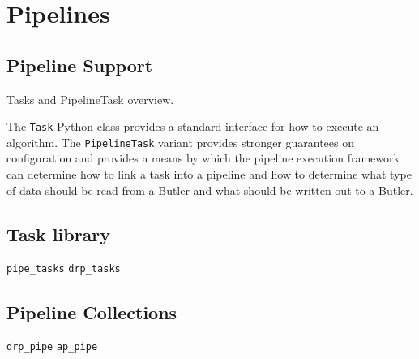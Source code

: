 \section{Pipelines}

\subsection{Pipeline Support}

Tasks and PipelineTask overview.

The \texttt{Task} Python class provides a standard interface for how to execute an algorithm.
The \texttt{PipelineTask} variant provides stronger guarantees on configuration and provides a means by which the pipeline execution framework can determine how to link a task into a pipeline and how to determine what type of data should be read from a Butler and what should be written out to a Butler.

\subsection{Task library}

\texttt{pipe\_tasks}
\texttt{drp\_tasks}

\subsection{Pipeline Collections}

\texttt{drp\_pipe}
\texttt{ap\_pipe}
